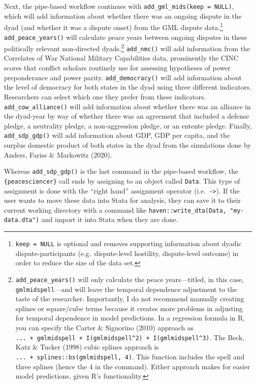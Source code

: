 \documentclass[
  11pt,
]{article}
\begin{document}
Next, the pipe-based workflow continues with \texttt{add\_gml\_mids(keep\ =\ NULL)}, which will add information about whether there was an ongoing dispute in the dyad (and whether it was a dispute onset) from the GML dispute data.\footnote{\texttt{keep\ =\ NULL} is optional and removes supporting information about dyadic dispute-participants (e.g.~dispute-level hostility, dispute-level outcome) in order to reduce the size of the data set.} \texttt{add\_peace\_years()} will calculate peace years between ongoing disputes in these politically relevant non-directed dyads.\footnote{\texttt{add\_peace\_years()} will only calculate the peace years---titled, in this case, \texttt{gmlmidspell}---and will leave the temporal dependence adjustment to the taste of the researcher. Importantly, I do not recommend manually creating splines or square/cube terms because it creates more problems in adjusting for temporal dependence in model predictions. In a regression formula in R, you can specify the Carter \& Signorino (2010) approach as \texttt{...\ +\ gmlmidspell\ +\ I(gmlmidspell\^{}2)\ +\ I(gmlmidspell\^{}3)}. The Beck, Katz \& Tucker (1998) cubic splines approach is \texttt{...\ +\ splines::bs(gmlmidspell,\ 4)}. This function includes the spell and three splines (hence the 4 in the command). Either approach makes for easier model predictions, given R's functionality.} \texttt{add\_nmc()} will add information from the Correlates of War National Military Capabilities data, prominently the CINC scores that conflict scholars routinely use for assessing hypotheses of power preponderance and power parity. \texttt{add\_democracy()} will add information about the level of democracy for both states in the dyad using three different indicators. Researchers can select which one they prefer from these indicators. \texttt{add\_cow\_alliance()} will add information about whether there was an alliance in the dyad-year by way of whether there was an agreement that included a defense pledge, a neutrality pledge, a non-aggression pledge, or an entente pledge. Finally, \texttt{add\_sdp\_gdp()} will add information about GDP, GDP per capita, and the surplus domestic product of both states in the dyad from the simulations done by Anders, Fariss \& Markowitz (2020).

Whereas \texttt{add\_sdp\_gdp()} is the last command in the pipe-based workflow, the \texttt{\{peacesciencer\}} call ends by assigning to an object called \texttt{Data}. This type of assignment is done with the ``right hand'' assignment operator (i.e.~\texttt{-\textgreater{}}). If the user wants to move these data into Stata for analysis, they can save it to their current working directory with a command like \texttt{haven::write\_dta(Data,\ "my-data.dta")} and import it into Stata when they are done.
\end{document}
